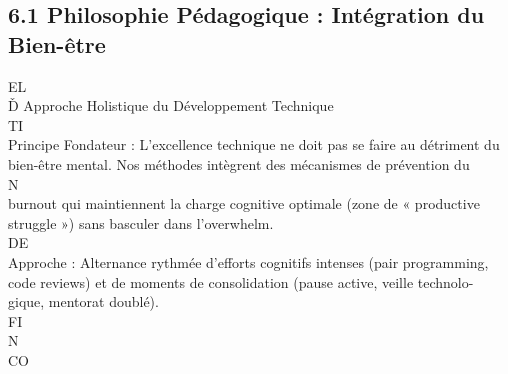 \subsection{6.1 Philosophie Pédagogique : Intégration du Bien-être}
\vspace{0.5em}
\vspace{0.5em}
\vspace{0.5em}
\vspace{0.5em}
EL\\
Ď Approche Holistique du Développement Technique\\
\vspace{0.5em}
\vspace{0.5em}
\vspace{0.5em}
\vspace{0.5em}
TI\\
Principe Fondateur : L’excellence technique ne doit pas se faire au détriment du bien-être mental. Nos méthodes intègrent des mécanismes de prévention du\\
\vspace{0.5em}
\vspace{0.5em}
\vspace{0.5em}
\vspace{0.5em}
N\\
burnout qui maintiennent la charge cognitive optimale (zone de « productive struggle ») sans basculer dans l’overwhelm.\\
\vspace{0.5em}
\vspace{0.5em}
\vspace{0.5em}
\vspace{0.5em}
DE\\
Approche : Alternance rythmée d’efforts cognitifs intenses (pair programming, code reviews) et de moments de consolidation (pause active, veille technolo-\\
gique, mentorat doublé).\\
\vspace{0.5em}
\vspace{0.5em}
\vspace{0.5em}
\vspace{0.5em}
FI\\
N\\
CO\\
